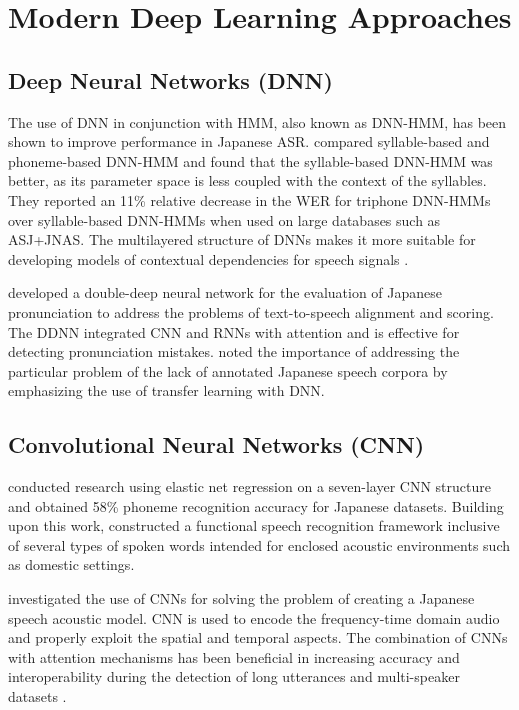 \section{Modern Deep Learning Approaches}
\subsection{Deep Neural Networks (DNN)}
The use of DNN in conjunction with HMM, also known as DNN-HMM, has been shown to improve performance in Japanese ASR. \textcite{seki2014comparison} compared syllable-based and phoneme-based DNN-HMM and found that the syllable-based DNN-HMM was better, as its parameter space is less coupled with the context of the syllables. They reported an 11\% relative decrease in the WER for triphone DNN-HMMs over syllable-based DNN-HMMs when used on large databases such as ASJ+JNAS. The multilayered structure of DNNs makes it more suitable for developing models of contextual dependencies for speech signals \parencite{hojo2018dnn}.

\textcite{mu2020japanese} developed a double-deep neural network for the evaluation of Japanese pronunciation to address the problems of text-to-speech alignment and scoring. The DDNN integrated CNN and RNNs with attention and is effective for detecting pronunciation mistakes. \textcite{lin2017dnn} noted the importance of addressing the particular problem of the lack of annotated Japanese speech corpora by emphasizing the use of transfer learning with DNN.

\subsection{Convolutional Neural Networks (CNN)}
\textcite{noda2014lipreading} conducted research using elastic net regression on a seven-layer CNN structure and obtained 58\% phoneme recognition accuracy for Japanese datasets. Building upon this work, \textcite{yalta2019cnn} constructed a functional speech recognition framework inclusive of several types of spoken words intended for enclosed acoustic environments such as domestic settings.

\textcite{noda2014lipreading} investigated the use of CNNs for solving the problem of creating a Japanese speech acoustic model. CNN is used to encode the frequency-time domain audio and properly exploit the spatial and temporal aspects. The combination of CNNs with attention mechanisms has been beneficial in increasing accuracy and interoperability during the detection of long utterances and multi-speaker datasets \parencite{Mukohara2015Emotion}.

